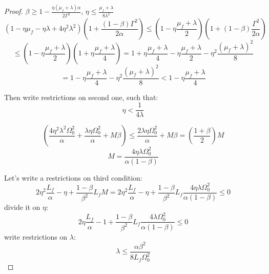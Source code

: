 \begin{proof}
$\beta \geq 1 - \frac{\eta(\mu_f+\lambda)\alpha}{2\Gamma^2}$, $\eta \leq \frac{\mu_f + \lambda}{8 \lambda^2}$
\begin{equation*}
    \left(1 - \eta\mu_f - \eta\lambda + 4\eta^2\lambda^2 \right)\left(1+\frac{(1-\beta)\Gamma^2}{2\alpha}\right) \leq \left(1 - \eta \frac{\mu_f+\lambda}{2}\right) \left(1 + (1-\beta) \frac{\Gamma^2}{2\alpha} \right)
\end{equation*}
\begin{equation*}
     \leq \left(1 - \eta \frac{\mu_f+\lambda}{2}\right) \left(1 + \eta\frac{\mu_f + \lambda}{4} \right) = 1 + \eta \frac{\mu_f + \lambda}{4} - \eta \frac{\mu_f + \lambda}{2} - \eta^2 \frac{(\mu_f+\lambda)^2}{8} 
\end{equation*}
\begin{equation*}
    = 1 - \eta \frac{\mu_f + \lambda}{4} - \eta^2 \frac{(\mu_f + \lambda)^2}{8} < 1 - \eta \frac{\mu_f + \lambda}{4}
\end{equation*}

Then write restrictions on second one, such that:
\begin{equation*}
\eta < \frac{1}{4\lambda} 
\end{equation*}

\begin{equation*}
    \left( \frac{4\eta^2\lambda^2\Omega_0^2}{\alpha} + \frac{\lambda\eta\Omega_0^2}{\alpha} + M\beta\right) \leq \frac{2\lambda\eta\Omega_0^2}{\alpha} + M\beta = \left(\frac{1+\beta}{2} \right)M
\end{equation*}
\begin{equation*}
    M = \frac{4\eta \lambda \Omega_0^2}{\alpha(1-\beta)}
\end{equation*}

Let's write a restrictions on third condition:
\begin{equation*}
    2\eta^2 \frac{L_f}{\alpha} - \eta + \frac{1-\beta}{\beta^2}L_fM = 2\eta^2 \frac{L_f}{\alpha} - \eta + \frac{1-\beta}{\beta^2}L_f \frac{4\eta \lambda \Omega_0^2}{\alpha(1-\beta)} \leq 0
\end{equation*}
divide it on $\eta$:
\begin{equation*}
    2\eta \frac{L_f}{\alpha} - 1 + \frac{1-\beta}{\beta^2}L_f \frac{4 \lambda \Omega_0^2}{\alpha(1-\beta)} \leq 0
\end{equation*}
write restrictions on $\lambda:$ 
\begin{equation*}
\lambda \leq \frac{\alpha \beta^2}{8L_f\Omega_0^2}    
\end{equation*}


\end{proof}
